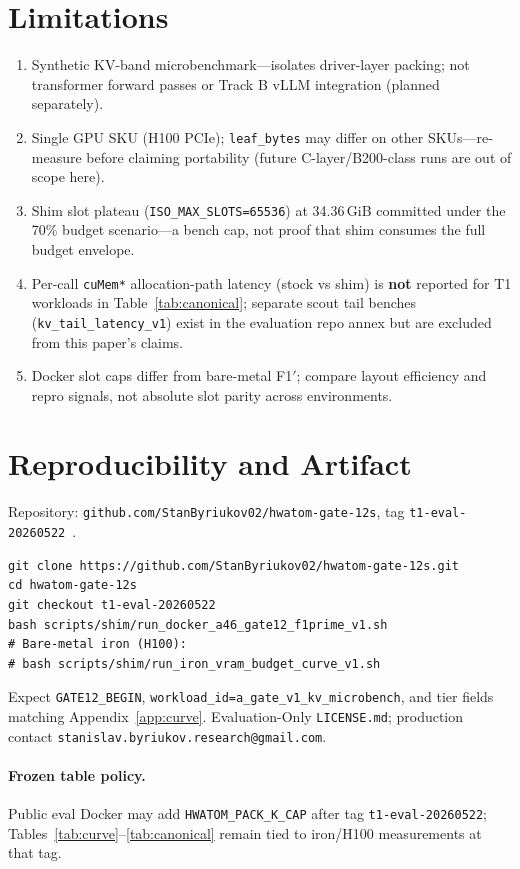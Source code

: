 \documentclass[11pt]{article}
\begin{document}
\section{Limitations}
\begin{enumerate}
  \item Synthetic KV-band microbenchmark---isolates driver-layer packing; not transformer forward passes or Track B vLLM integration (planned separately).
  \item Single GPU SKU (H100 PCIe); \texttt{leaf\_bytes} may differ on other SKUs---re-measure before claiming portability (future C-layer/B200-class runs are out of scope here).
  \item Shim slot plateau (\texttt{ISO\_MAX\_SLOTS=65536}) at 34.36\,GiB committed under the 70\% budget scenario---a bench cap, not proof that shim consumes the full budget envelope.
  \item Per-call \texttt{cuMem*} allocation-path latency (stock vs shim) is \textbf{not} reported for T1 workloads in Table~\ref{tab:canonical}; separate scout tail benches (\texttt{kv\_tail\_latency\_v1}) exist in the evaluation repo annex but are excluded from this paper's claims.
  \item Docker slot caps differ from bare-metal F1$'$; compare layout efficiency and repro signals, not absolute slot parity across environments.
\end{enumerate}

\section{Reproducibility and Artifact}

Repository: \texttt{github.com/StanByriukov02/hwatom-gate-12s}, tag \texttt{t1-eval-20260522}~\cite{hardware_atom_t1}.

\begin{lstlisting}
git clone https://github.com/StanByriukov02/hwatom-gate-12s.git
cd hwatom-gate-12s
git checkout t1-eval-20260522
bash scripts/shim/run_docker_a46_gate12_f1prime_v1.sh
# Bare-metal iron (H100):
# bash scripts/shim/run_iron_vram_budget_curve_v1.sh
\end{lstlisting}

Expect \texttt{GATE12\_BEGIN}, \texttt{workload\_id=a\_gate\_v1\_kv\_microbench}, and tier fields matching Appendix~\ref{app:curve}.
Evaluation-Only \texttt{LICENSE.md}; production contact \texttt{stanislav.byriukov.research@gmail.com}.

\paragraph{Frozen table policy.}
Public eval Docker may add \texttt{HWATOM\_PACK\_K\_CAP} after tag \texttt{t1-eval-20260522}; Tables~\ref{tab:curve}--\ref{tab:canonical} remain tied to iron/H100 measurements at that tag.
\end{document}
